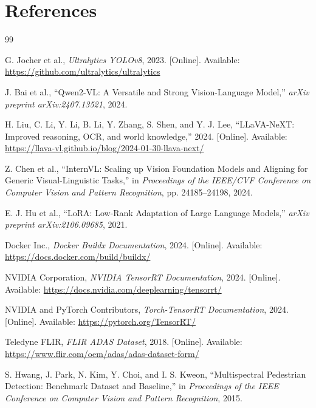 
\clearpage
{}
\section*{References}
\renewcommand{\refname}{}
\singlespacing
\begin{thebibliography}{99}
\vspace{-\topsep}

G. Jocher et al.,
\textit{Ultralytics YOLOv8}, 2023.
[Online]. Available: \url{https://github.com/ultralytics/ultralytics}

J. Bai et al.,
``Qwen2-VL: A Versatile and Strong Vision-Language Model,''
\textit{arXiv preprint arXiv:2407.13521}, 2024.

H. Liu, C. Li, Y. Li, B. Li, Y. Zhang, S. Shen, and Y. J. Lee,
``LLaVA-NeXT: Improved reasoning, OCR, and world knowledge,''
2024.
[Online]. Available: \url{https://llava-vl.github.io/blog/2024-01-30-llava-next/}

Z. Chen et al.,
``InternVL: Scaling up Vision Foundation Models and Aligning for Generic
Visual-Linguistic Tasks,''
in \textit{Proceedings of the IEEE/CVF Conference on Computer Vision and Pattern
Recognition}, pp. 24185--24198, 2024.

E. J. Hu et al.,
``LoRA: Low-Rank Adaptation of Large Language Models,''
\textit{arXiv preprint arXiv:2106.09685}, 2021.

Docker Inc.,
\textit{Docker Buildx Documentation}, 2024.
[Online]. Available: \url{https://docs.docker.com/build/buildx/}

NVIDIA Corporation,
\textit{NVIDIA TensorRT Documentation}, 2024.
[Online]. Available: \url{https://docs.nvidia.com/deeplearning/tensorrt/}

NVIDIA and PyTorch Contributors,
\textit{Torch-TensorRT Documentation}, 2024.
[Online]. Available: \url{https://pytorch.org/TensorRT/}

Teledyne FLIR,
\textit{FLIR ADAS Dataset}, 2018.
[Online]. Available: \url{https://www.flir.com/oem/adas/adas-dataset-form/}

S. Hwang, J. Park, N. Kim, Y. Choi, and I. S. Kweon,
``Multispectral Pedestrian Detection: Benchmark Dataset and Baseline,''
in \textit{Proceedings of the IEEE Conference on Computer Vision and Pattern
Recognition}, 2015.


\end{thebibliography}
